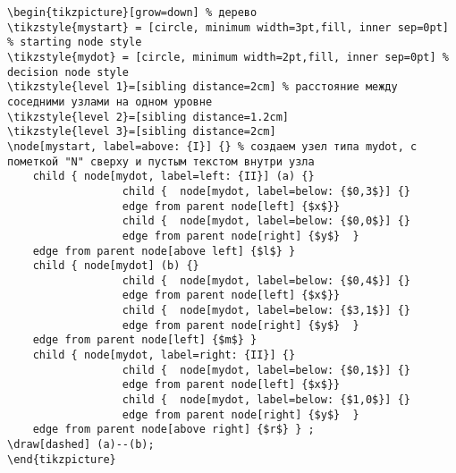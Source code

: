 \documentclass[12pt,a4paper]{article}
\begin{document}
\begin{verbatim}
\begin{tikzpicture}[grow=down] % дерево
\tikzstyle{mystart} = [circle, minimum width=3pt,fill, inner sep=0pt] % starting node style
\tikzstyle{mydot} = [circle, minimum width=2pt,fill, inner sep=0pt] % decision node style
\tikzstyle{level 1}=[sibling distance=2cm] % расстояние между соседними узлами на одном уровне
\tikzstyle{level 2}=[sibling distance=1.2cm]
\tikzstyle{level 3}=[sibling distance=2cm]
\node[mystart, label=above: {I}] {} % создаем узел типа mydot, с пометкой "N" сверху и пустым текстом внутри узла
    child { node[mydot, label=left: {II}] (a) {}
                  child {  node[mydot, label=below: {$0,3$}] {}
                  edge from parent node[left] {$x$}}
                  child {  node[mydot, label=below: {$0,0$}] {}
                  edge from parent node[right] {$y$}  }
    edge from parent node[above left] {$l$} }
    child { node[mydot] (b) {}
                  child {  node[mydot, label=below: {$0,4$}] {}
                  edge from parent node[left] {$x$}}
                  child {  node[mydot, label=below: {$3,1$}] {}
                  edge from parent node[right] {$y$}  }
    edge from parent node[left] {$m$} }
    child { node[mydot, label=right: {II}] {}
                  child {  node[mydot, label=below: {$0,1$}] {}
                  edge from parent node[left] {$x$}}
                  child {  node[mydot, label=below: {$1,0$}] {}
                  edge from parent node[right] {$y$}  }
    edge from parent node[above right] {$r$} } ;
\draw[dashed] (a)--(b);
\end{tikzpicture}
\end{verbatim}




\newpage
{}




\newpage
{}





\newpage
{}
\end{document}
